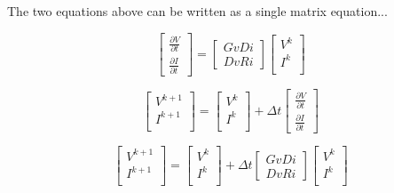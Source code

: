 \documentclass[12pt, letterpaper]{article}
\begin{document}
The two equations above can be written as a single matrix equation...

\begin{equation}
    \begin{bmatrix}
    	\frac{\partial{V}}{\partial{t}} \\
    	\frac{\partial{I}}{\partial{t}} 
    \end{bmatrix}	
	=
	\begin{bmatrix}
		Gv Di \\
		Dv Ri
	\end{bmatrix}
	\begin{bmatrix}
		V^k \\
		I^k \\
	\end{bmatrix}
\end{equation}


\begin{equation}
	\begin{bmatrix}
		V^{k+1} \\
		I^{k+1} \\
	\end{bmatrix}
	=
	\begin{bmatrix}
		V^k \\
		I^k \\
	\end{bmatrix}
	+
	\Delta t
\begin{bmatrix}
	\frac{\partial{V}}{\partial{t}} \\
	\frac{\partial{I}}{\partial{t}} 
\end{bmatrix}	
\end{equation}

\begin{equation}
	\begin{bmatrix}
		V^{k+1} \\
		I^{k+1} \\
	\end{bmatrix}
	=
	\begin{bmatrix}
		V^k \\
		I^k \\
	\end{bmatrix}
	+
	\Delta t
	\begin{bmatrix}
		Gv Di \\
		Dv Ri
	\end{bmatrix}
	\begin{bmatrix}
		V^k \\
		I^k \\
	\end{bmatrix}	
\end{equation}
\end{document}
